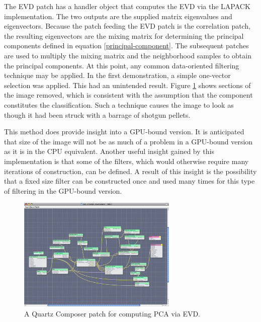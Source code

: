 \documentclass[11pt]{article}
\begin{document}
The EVD patch has a handler object that computes the EVD via the LAPACK implementation.  The two outputs are the supplied matrix eigenvalues and eigenvectors.  Because the patch feeding the EVD patch is the correlation patch, the resulting eigenvectors are the mixing matrix for determining the principal components defined in equation \ref{principal-component}.  The subsequent patches are used to multiply the mixing matrix and the neighborhood samples to obtain the principal components.  At this point, any common data-oriented filtering technique may be applied.   In the first demonstration, a simple one-vector selection was applied.   This had an unintended result.   Figure \ref{downsampled-pca-quartz-composer} shows %
sections of the image removed, which is consistent with the assumption that the component constitutes the classification.  %
Such a technique causes the image to look as though it had been struck with a barrage of shotgun pellets.  

This method does provide insight into a GPU-bound version.  It is anticipated that size of the image will not be as much of a problem in a GPU-bound version as it is in the CPU equivalent.  Another useful insight gained by this implementation is that some of the filters, which would otherwise require many iterations of construction, can be defined.  A result of this insight is the possibility that a fixed size filter can be constructed once and used many times for this type of filtering in the GPU-bound version.


\begin{figure}[htbp] %
   \centering
   \includegraphics[width=3in]{pca-attempt-downsample.jpg} 
   \caption{A Quartz Composer patch for computing PCA via EVD.}
   \label{downsampled-pca-quartz-composer}
\end{figure}
\end{document}

